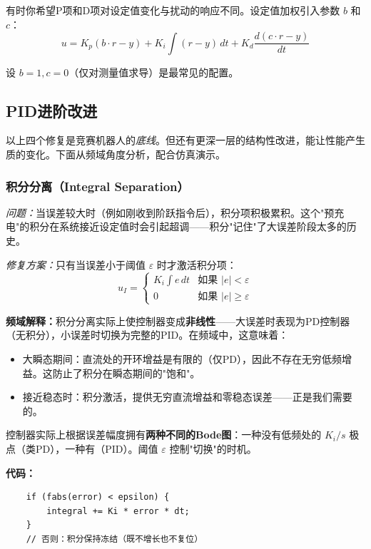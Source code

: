 有时你希望P项和D项对设定值变化与扰动的响应不同。设定值加权引入参数 $b$ 和 $c$：
\begin{equation}
u = K_p(b \cdot r - y) + K_i \int (r - y) \, dt + K_d \frac{d(c \cdot r - y)}{dt}
\end{equation}

设 $b = 1, c = 0$（仅对测量值求导）是最常见的配置。

\subsection{PID进阶改进}

以上四个修复是竞赛机器人的\textit{底线}。但还有更深一层的结构性改进，能让性能产生质的变化。下面从频域角度分析，配合仿真演示。

\subsubsection{积分分离（Integral Separation）}

\textit{问题：}当误差较大时（例如刚收到阶跃指令后），积分项积极累积。这个"预充电"的积分在系统接近设定值时会引起超调——积分"记住"了大误差阶段太多的历史。

\textit{修复方案：}只有当误差小于阈值 $\varepsilon$ 时才激活积分项：
\begin{equation}
u_I = \begin{cases} K_i \int e \, dt & \text{如果 } |e| < \varepsilon \\ 0 & \text{如果 } |e| \geq \varepsilon \end{cases}
\end{equation}

\textbf{频域解释：}积分分离实际上使控制器变成\textbf{非线性}——大误差时表现为PD控制器（无积分），小误差时切换为完整的PID。在频域中，这意味着：
\begin{itemize}
    \item 大瞬态期间：直流处的开环增益是有限的（仅PD），因此不存在无穷低频增益。这防止了积分在瞬态期间的"饱和"。
    \item 接近稳态时：积分激活，提供无穷直流增益和零稳态误差——正是我们需要的。
\end{itemize}

控制器实际上根据误差幅度拥有\textbf{两种不同的Bode图}：一种没有低频处的 $K_i/s$ 极点（类PD），一种有（PID）。阈值 $\varepsilon$ 控制"切换"的时机。

\textbf{代码：}
\begin{verbatim}
    if (fabs(error) < epsilon) {
        integral += Ki * error * dt;
    }
    // 否则：积分保持冻结（既不增长也不复位）
\end{verbatim}

